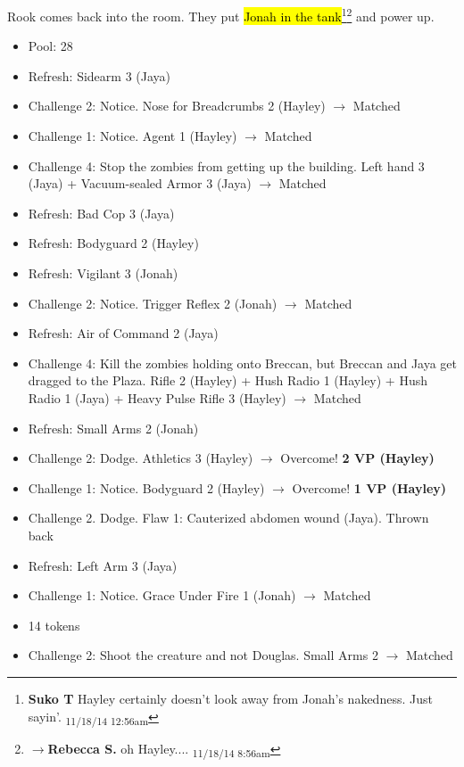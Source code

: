 Rook comes back into the room.  They put \hl{Jonah in the tank}\footnote{\textbf{Suko T }Hayley certainly doesn't look away from Jonah's nakedness.  Just sayin'. \textsubscript{11/18/14 12:56am}}\footnote{$\rightarrow$\textbf{Rebecca S. }oh Hayley.... \textsubscript{11/18/14 8:56am}} and power up.  





\begin{itemize}[noitemsep,topsep=0pt]
\item Pool: 28
\item Refresh: Sidearm 3 (Jaya)
\item Challenge 2: Notice.  Nose for Breadcrumbs 2 (Hayley) $\rightarrow$ Matched
\item Challenge 1: Notice. Agent 1 (Hayley) $\rightarrow$ Matched
\item Challenge 4: Stop the zombies from getting up the building.  Left hand 3 (Jaya) + Vacuum-sealed Armor 3 (Jaya) $\rightarrow$ Matched
\item Refresh: Bad Cop 3 (Jaya)
\item Refresh: Bodyguard 2 (Hayley)
\item Refresh: Vigilant 3 (Jonah)
\item Challenge 2: Notice. Trigger Reflex 2 (Jonah) $\rightarrow$ Matched
\item Refresh: Air of Command 2 (Jaya)
\item Challenge 4: Kill the zombies holding onto Breccan, but Breccan and Jaya get dragged to the Plaza.  Rifle 2 (Hayley) + Hush Radio 1 (Hayley) + Hush Radio 1 (Jaya) + Heavy Pulse Rifle 3 (Hayley) $\rightarrow$ Matched
\item Refresh: Small Arms 2 (Jonah)
\item Challenge 2: Dodge.  Athletics 3 (Hayley) $\rightarrow$  Overcome! \textbf{2 VP (Hayley)}
\item Challenge 1: Notice.  Bodyguard 2 (Hayley) $\rightarrow$  Overcome! \textbf{1 VP (Hayley)}
\item Challenge 2. Dodge.   Flaw 1: Cauterized abdomen wound (Jaya).  Thrown back
\item Refresh: Left Arm 3 (Jaya)
\item Challenge 1: Notice.  Grace Under Fire 1 (Jonah) $\rightarrow$ Matched
\item 14 tokens
\item Challenge 2: Shoot the creature and not Douglas.  Small Arms 2 $\rightarrow$ Matched

\end{itemize}
